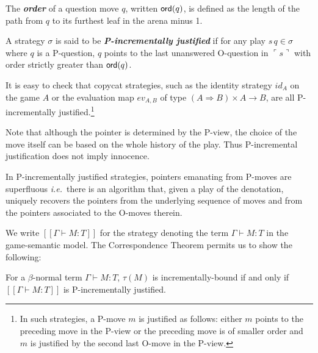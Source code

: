 \documentclass{llncs}
\newcommand\defname[1]{{\bf\em #1}\index{#1}}
\newcommand\ord[1]{{\sf
    ord}(#1)} \newcommand\typear{\rightarrow}
\newcommand{\sem}[1]{{[\![ #1 ]\!]}}
\newcommand{\pview}[1]{\ulcorner #1 \urcorner}
\begin{document}
The \defname{order} of a question move $q$, written $\ord{q}$, is
defined as the length of the path from $q$ to its furthest leaf in the
arena minus 1.

\begin{definition}\rm
  A strategy $\sigma$ is said to be \defname{P-incrementally
    justified} if for any play $s \, q \in \sigma$ where $q$ is a
  P-question, $q$ points to the last unanswered O-question in $\pview{s}$ with
  order strictly greater than $\ord{q}$.
\end{definition}
\begin{example}
It is easy to check that copycat strategies, such as the identity strategy $id_A$ on the game $A$ or the evaluation map $ev_{A,B}$ of type $(A \Rightarrow B) \times A \typear B$, are all P-incrementally justified.\footnote{In such strategies, a P-move $m$ is justified as follows: either $m$ points to the preceding move in the P-view or the preceding move is of smaller order and $m$ is justified by the second last O-move in the P-view.}
\end{example}
%
Note that although the pointer is determined by the P-view, the choice of the move itself
can be based on the whole history of the play. Thus P-incremental justification does not imply innocence.


\begin{lemma}
  \label{lem:incrjustified_pointers_uniqu_recover} In P-incrementally
  justified strategies, pointers emanating from P-moves are
  superfluous {\it i.e.}~there is an algorithm that, given a play of the
  denotation, uniquely recovers the pointers from the underlying
  sequence of moves and from the pointers associated to the O-moves
  therein.
\end{lemma}

We write $\sem{\Gamma \vdash M : T}$ for the strategy 
denoting the term $\Gamma \vdash M : T$ in the game-semantic model.
The Correspondence Theorem
permits us to show the following:
\begin{proposition} %
\label{prop:incrbound_imp_incrjustified}
For a $\beta$-normal term $\Gamma \vdash M : T$,
$\tau(M)$ is incrementally-bound if and only if $\sem{\Gamma \vdash M : T}$
is P-incrementally justified.
\end{proposition}
\end{document}
